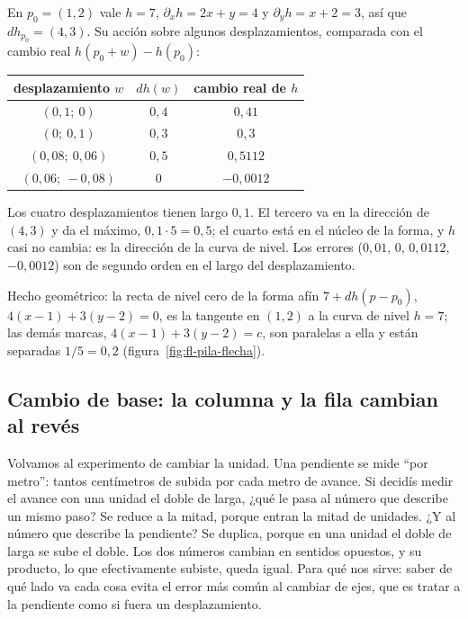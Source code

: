 \begin{ejemplo}[El gradiente de \(h(x,y)=x^2+xy+2y\) en \((1,2)\)]\label{ej:fl-gradiente}
En \(p_0=(1,2)\) vale \(h=7\), \(\partial_xh=2x+y=4\) y \(\partial_yh=x+2=3\), así que
\(dh_{p_0}=(4,3)\). Su acción sobre algunos desplazamientos, comparada con el cambio real
\(h(p_0+w)-h(p_0)\):
\begin{center}
\begin{tabular}{ccc}
desplazamiento \(w\) & \(dh(w)\) & cambio real de \(h\)\\\hline
\((0{,}1;\ 0)\) & \(0{,}4\) & \(0{,}41\)\\
\((0;\ 0{,}1)\) & \(0{,}3\) & \(0{,}3\)\\
\((0{,}08;\ 0{,}06)\) & \(0{,}5\) & \(0{,}5112\)\\
\((0{,}06;\ -0{,}08)\) & \(0\) & \(-0{,}0012\)
\end{tabular}
\end{center}
Los cuatro desplazamientos tienen largo \(0{,}1\). El tercero va en la dirección de \((4,3)\)
y da el máximo, \(0{,}1\cdot5=0{,}5\); el cuarto está en el núcleo de la forma, y \(h\) casi
no cambia: es la dirección de la curva de nivel. Los errores (\(0{,}01\), \(0\),
\(0{,}0112\), \(-0{,}0012\)) son de segundo orden en el largo del desplazamiento.

Hecho geométrico: la recta de nivel cero de la forma afín \(7+dh(p-p_0)\),
\(4(x-1)+3(y-2)=0\), es la tangente en \((1,2)\) a la curva de nivel \(h=7\); las demás
marcas, \(4(x-1)+3(y-2)=c\), son paralelas a ella y están separadas \(1/5=0{,}2\)
(figura~\ref{fig:fl-pila-flecha}).
\end{ejemplo}

\subsection{Cambio de base: la columna y la fila cambian al revés}\label{sec:co-contravariante}

Volvamos al experimento de cambiar la unidad. Una pendiente se mide \enquote{por metro}: tantos
centímetros de subida por cada metro de avance. Si decidís medir el avance con una unidad el
doble de larga, ¿qué le pasa al número que describe un mismo paso? Se reduce a la mitad,
porque entran la mitad de unidades. ¿Y al número que describe la pendiente? Se duplica, porque
en una unidad el doble de larga se sube el doble. Los dos números cambian en sentidos
opuestos, y su producto, lo que efectivamente subiste, queda igual. Para qué nos sirve:
saber de qué lado va cada cosa evita el error más común al cambiar de ejes, que es tratar a la
pendiente como si fuera un desplazamiento.

